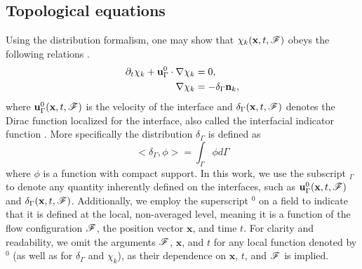 
\subsection{Topological equations}
Using the distribution formalism, one may show that $\chi_k(\textbf{x},t,\mathscr{F})$ obeys the following relations \citep{drew1983mathematical}. 
\begin{align}
    \partial_t \chi_k
    + \textbf{u}_\Gamma^0 \cdot \mathbf{\nabla} \chi_k
    &= 0,
    \label{eq:dt_chi_k}\\
    \label{eq:grad_chi_k}
    \mathbf{\nabla} \chi_k
    &= - \delta_\Gamma \textbf{n}_k, 
\end{align}
where $\textbf{u}^0_\Gamma(\textbf{x},t,\mathscr{F})$ is the velocity of the interface and $\delta_\Gamma(\textbf{x},t,\mathscr{F})$ denotes the Dirac function localized for the interface, also called the interfacial indicator function \citep{drew1983mathematical,junqua2003}. More specifically the distribution $\delta_\Gamma$ is defined as \citep{appel2007}
\begin{equation}
<\delta_\Gamma,\phi> =\int_{\Gamma} \phi d\Gamma 
\end{equation}  
where $\phi$ is a function with compact support. %
In this work, we use the subscript $_\Gamma$ to denote any quantity inherently defined on the interfaces, such as $\textbf{u}_\Gamma^0(\textbf{x}, t, \mathscr{F})$ and $\delta_\Gamma(\textbf{x}, t, \mathscr{F})$. Additionally, we employ the superscript $^0$ on a field to indicate that it is defined at the local, non-averaged level, meaning it is a function of the flow configuration $\mathscr{F}$, the position vector $\textbf{x}$, and time $t$. For clarity and readability, we omit the arguments $\mathscr{F}$, $\textbf{x}$, and $t$ for any local function denoted by $^0$ (as well as for $\delta_\Gamma$ and $\chi_k$), as their dependence on $\textbf{x}$, $t$, and $\mathscr{F}$ is implied.

